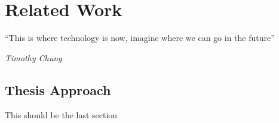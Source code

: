 \chapter{Related Work} %
\label{chap:Chapter3}       %


\epigraph{``This is where technology is now, imagine where we can go in the future” }{\textit{Timothy Chung}}


\section{Thesis Approach}
This should be the last section
